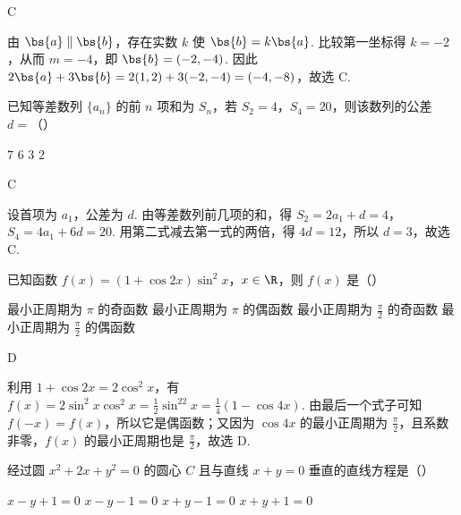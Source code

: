\begin{answer}
C
\end{answer}

\begin{solution}
由 \(\bs{a}\parallel\bs{b}\)，存在实数 \(k\) 使 \(\bs{b}=k\bs{a}\). 比较第一坐标得 \(k=-2\)，从而 \(m=-4\)，即 \(\bs{b}=(-2,-4)\). 因此
\(2\bs{a}+3\bs{b}=2(1,2)+3(-2,-4)=(-4,-8)\)，故选 C.
\end{solution}

\begin{problem}
已知等差数列 \(\{a_n\}\) 的前 \(n\) 项和为 \(S_n\)，若 \(S_2 = 4\)，\(S_4 = 20\)，则该数列的公差 \(d =\)（\quad）

\choices
    {\(7\)}
    {\(6\)}
    {\(3\)}
    {\(2\)}
\end{problem}

\begin{answer}
C
\end{answer}

\begin{solution}
设首项为 \(a_1\)，公差为 \(d\). 由等差数列前几项的和，得
\(S_2=2a_1+d=4\)，\(S_4=4a_1+6d=20\). 用第二式减去第一式的两倍，得 \(4d=12\)，所以 \(d=3\)，故选 C.
\end{solution}

\begin{problem}
已知函数 \(f(x) = (1 + \cos 2x)\sin^2 x\)，\(x \in \R\)，则 \(f(x)\) 是（\quad）

\choices
    {最小正周期为 \(\pi\) 的奇函数}
    {最小正周期为 \(\pi\) 的偶函数}
    {最小正周期为 \(\frac{\pi}{2}\) 的奇函数}
    {最小正周期为 \(\frac{\pi}{2}\) 的偶函数}
\end{problem}

\begin{answer}
D
\end{answer}

\begin{solution}
利用 \(1+\cos2x=2\cos^2x\)，有
\(f(x)=2\sin^2x\cos^2x=\frac{1}{2}\sin^22x=\frac14(1-\cos4x)\). 由最后一个式子可知 \(f(-x)=f(x)\)，所以它是偶函数；又因为 \(\cos4x\) 的最小正周期为 \(\frac{\pi}{2}\)，且系数非零，\(f(x)\) 的最小正周期也是 \(\frac{\pi}{2}\)，故选 D.
\end{solution}

\begin{problem}
经过圆 \(x^2 + 2x + y^2 = 0\) 的圆心 \(C\) 且与直线 \(x + y = 0\) 垂直的直线方程是（\quad）

\choices
    {\(x - y + 1 = 0\)}
    {\(x - y - 1 = 0\)}
    {\(x + y - 1 = 0\)}
    {\(x + y + 1 = 0\)}
\end{problem}

